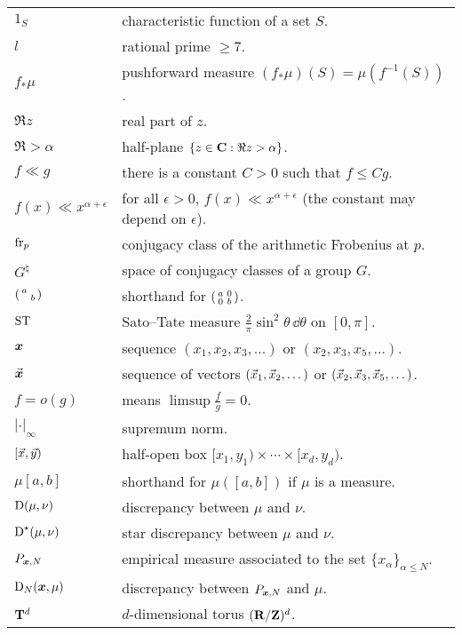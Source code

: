 \documentclass[phd,tocprelim]{cornell}
\begin{document}
\contentspage





\symlist

\begin{tabular}{ll}
$1_S$     
	& characteristic function of a set $S$. \\
$l$       
	& rational prime $\geqslant 7$. \\
$f_\ast\mu$
	& pushforward measure $(f_\ast\mu)(S) = \mu(f^{-1}(S))$. \\
$\Re z$
	& real part of $z$. \\
$\Re > \alpha$
	& half-plane $\{z\in \mathbf{C} : \Re z > \alpha\}$. \\
$f \ll g$ 
	& there is a constant $C>0$ such that $f \leqslant C g$. \\
$f(x) \ll x^{\alpha+\epsilon}$ 
	& for all $\epsilon>0$, $f(x) \ll x^{\alpha+\epsilon}$ (the constant may depend on $\epsilon$). \\
$\mathrm{fr}_p$
	& conjugacy class of the arithmetic Frobenius at $p$. \\
$G^\natural$
	& space of conjugacy classes of a group $G$. \\
$\left(\begin{smallmatrix} a &  \\  & b \end{smallmatrix}\right)$
	& shorthand for $\left(\begin{smallmatrix} a & 0 \\ 0 & b \end{smallmatrix}\right)$. \\
$\mathrm{ST}$
	& Sato--Tate measure $\frac{2}{\pi} \sin^2\theta\, \dd\theta$ on $[0,\pi]$. \\
${\boldsymbol x}$
	& sequence $(x_1,x_2,x_3,\dots)$ or $(x_2,x_3,x_5,\dots)$. \\
$\vec{\boldsymbol x}$
	& sequence of vectors $(\vec{x}_1,\vec{x}_2,\dots)$ or $(\vec{x}_2,\vec{x}_3,\vec{x}_5,\dots)$. \\
$f = o(g)$
	& means $\limsup \frac f g = 0$. \\
$|\cdot|_\infty$
	& supremum norm. \\
$[\vec{x},\vec{y})$
	& half-open box $[x_1,y_1) \times \cdots \times [x_d,y_d)$. \\
$\mu[a,b]$
	& shorthand for $\mu([a,b])$ if $\mu$ is a measure. \\
$\operatorname{D}(\mu,\nu)$
	& discrepancy between $\mu$ and $\nu$. \\
$\operatorname{D}^\star(\mu,\nu)$
	& star discrepancy between $\mu$ and $\nu$. \\
$P_{{\boldsymbol x},N}$
	& empirical measure associated to the set $\{x_\alpha\}_{\alpha\leqslant N}$. \\
$\operatorname{D}_N({\boldsymbol x},\mu)$
	& discrepancy between $P_{{\boldsymbol x},N}$ and $\mu$. \\
$\mathbf{T}^d$
	& $d$-dimensional torus $(\mathbf{R}/\mathbf{Z})^d$. \\

\end{tabular}
\end{document}
